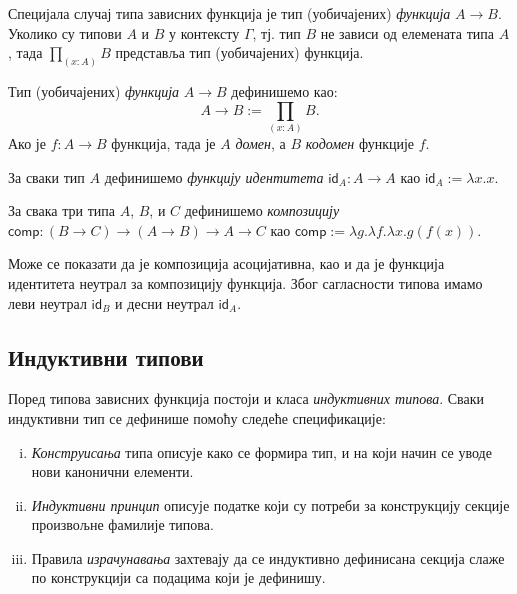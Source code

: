 \documentclass[12pt,oneside]{memoir}
\begin{document}
Специјала случај типа зависних функција је тип (уобичајених) \emph{функција} $A \to B$. Уколико су типови $A$ и $B$ у контексту $\Gamma$, тј. тип $B$ не зависи од елемената типа $A$, тада $\prod_{(x:A)} B$ представља тип (уобичајених) функција. 

\begin{definition}
    Тип (уобичајених) \emph{функција} $A \to B$ дефинишемо као:
    \begin{equation}
        A \to B:= \prod_{(x:A)} B.
    \end{equation}
    Ако је $f : A \to B$ функција, тада је $A$ \emph{домен}, а $B$ \emph{кодомен} функције $f$. 
\end{definition}

\begin{definition}
    За сваки тип $A$ дефинишемо \emph{функцију идентитета} $\mathsf{id}_A : A \to A$ као $\mathsf{id}_A := \lambda x.x$.
\end{definition}

\begin{definition}
    За свака три типа $A$, $B$, и $C$ дефинишемо \emph{композицију} $\mathsf{comp} : (B \to C) \to (A \to B) \to A \to C$ као $\mathsf{comp} := \lambda g.\lambda f.\lambda x.g(f(x))$.
\end{definition}
Може се показати да је композиција асоцијативна, као и да је функција идентитета неутрал за композицију функција. Због сагласности типова имамо леви неутрал $\mathsf{id}_B$ и десни неутрал $\mathsf{id}_A$.

\subsection{Индуктивни типови}

Поред типова зависних функција постоји и класа \emph{индуктивних типова}. Сваки индуктивни тип се дефинише помоћу следеће спецификације: 

\begin{enumerate}[(i)]
    \item{\emph{Конструисања} типа описује како се формира тип, и на који начин се уводе нови канонични елементи.}
    \item{\emph{Индуктивни принцип} описује податке који су потреби за конструкцију секције произвољне фамилије типова.}
    \item{Правила \emph{израчунавања} захтевају да се индуктивно дефинисана секција слаже по конструкцији са подацима који је дефинишу.}
\end{enumerate}
\end{document}
